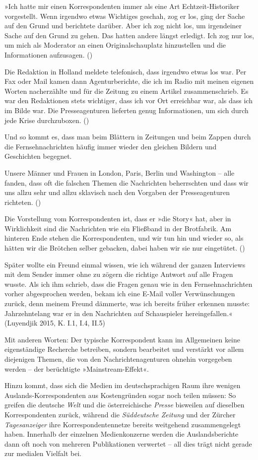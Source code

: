 »Ich hatte mir einen Korrespondenten immer als eine Art
Echtzeit-Historiker vorgestellt. Wenn irgendwo etwas Wichtiges geschah,
zog er los, ging der Sache auf den Grund und berichtete darüber. Aber
ich zog nicht los, um irgendeiner Sache auf den Grund zu gehen. Das
hatten andere längst erledigt. Ich zog nur los, um mich als Moderator an
einen Original­schauplatz hinzustellen und die Informationen aufzusagen.
()

Die Redaktion in Holland meldete telefonisch, dass irgendwo etwas los
war. Per Fax oder Mail kamen dann Agenturberichte, die ich im Radio mit
meinen eigenen Worten nacherzählte und für die Zeitung zu einem Artikel
zusammenschrieb. Es war den Redaktionen stets wichtiger, dass ich vor
Ort erreichbar war, als dass ich im Bilde war. Die Presseagenturen
lieferten genug Informationen, um sich durch jede Krise durchzuboxen. ()

Und so kommt es, dass man beim Blättern in Zeitungen und beim Zappen
durch die Fernsehnachrichten häufig immer wieder den gleichen Bildern
und Geschichten begegnet.

Unsere Männer und Frauen in London, Paris, Berlin und Washington -- alle
fanden, dass oft die falschen Themen die Nachrichten beherrschten und
dass wir uns allzu sehr und allzu sklavisch nach den Vorgaben der
Presseagenturen richteten. ()

Die Vorstellung vom Korrespondenten ist, dass er »die Story« hat, aber
in Wirklichkeit sind die Nachrichten wie ein Fließband in der
Brotfabrik. Am hinteren Ende stehen die Korrespondenten, und wir tun hin
und wieder so, als hätten wir die Brötchen selber gebacken, dabei haben
wir sie nur eingetütet. ()

Später wollte ein Freund einmal wissen, wie ich während der ganzen
Interviews mit dem Sender immer ohne zu zögern die richtige Antwort auf
alle Fragen wusste. Als ich ihm schrieb, dass die Fragen genau wie in
den Fernsehnachrichten vorher abgesprochen werden, bekam ich eine E-Mail
voller Verwünschungen zurück, denn meinem Freund dämmerte, was ich
bereits früher erkennen musste: Jahrzehntelang war er in den Nachrichten
auf Schauspieler herein­ge­fallen.« (Luyendjik 2015, K. I.1, I.4, II.5)

Mit anderen Worten: Der typische Korrespondent kann im Allgemeinen keine
eigenständige Recherche betreiben, sondern bearbeitet und verstärkt vor
allem diejenigen Themen, die von den Nachrichten­agenturen ohnehin
vorgegeben werden -- der berüchtigte »Mainstream-Effekt«.

Hinzu kommt, dass sich die Medien im deutschsprachigen Raum ihre wenigen
Auslands-Korrespondenten aus Kostengründen sogar noch teilen müssen: So
greifen die deutsche \emph{Welt} und die österreichische \emph{Presse}
bisweilen auf dieselben Korrespondenten zurück, während die
\emph{Süddeutsche Zeitung} und der Zürcher \emph{Tagesanzeiger} ihre
Korrespondentennetze bereits weitgehend zusammen­gelegt haben. Innerhalb
der einzelnen Medienkonzerne werden die Auslandsberichte dann oft noch
von mehreren Publikationen verwertet -- all dies trägt nicht gerade zur
medialen Vielfalt bei.


